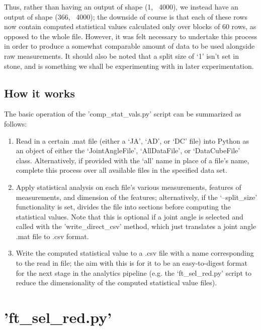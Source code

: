 \documentclass[12pt,twoside]{report}
\begin{document}
\quad Thus, rather than having an output of shape (1, ~4000), we instead have an output of shape (366, ~4000); the downside of course is that each of these rows now contain computed statistical values calculated only over blocks of 60 rows, as opposed to the whole file. However, it was felt necessary to undertake this process in order to produce a somewhat comparable amount of data to be used alongside raw measurements. It should also be noted that a split size of ‘1’ isn’t set in stone, and is something we shall be experimenting with in later experimentation.

\subsection{How it works}

\quad The basic operation of the 'comp\_stat\_vals.py' script can be summarized as follows:

\begin{enumerate}
	\item Read in a certain .mat file (either a ‘JA’, ‘AD’, or ‘DC’ file) into Python as an object of either the ‘JointAngleFile’, ‘AllDataFile’, or ‘DataCubeFile’ class. Alternatively, if provided with the ‘all’ name in place of a file’s name, complete this process over all available files in the specified data set.
	\item Apply statistical analysis on each file’s various measurements, features of measurements, and dimension of the features; alternatively, if the ‘--split\_size’ functionality is set, divides the file into sections before computing the statistical values.  Note that this is optional if a joint angle is selected and called with the 'write\_direct\_csv' method, which just translates a joint angle .mat file to .csv format.
	\item Write the computed statistical value  to a .csv file with a name corresponding to the read in file; the aim with this is for it to be an easy-to-digest format for the next stage in the analytics pipeline (e.g. the ‘ft\_sel\_red.py’ script to reduce the dimensionality of the computed statistical value files).
\end{enumerate}



\section{'ft\_sel\_red.py'}
\end{document}
